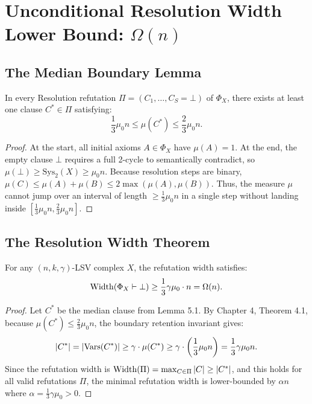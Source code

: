 \chapter{Unconditional Resolution Width Lower Bound: $\Omega(n)$}

\section{The Median Boundary Lemma}
\begin{lemma}
In every Resolution refutation $\Pi = (C_1, \dots, C_S = \bot)$ of $\Phi_X$, there exists at least one clause $C^* \in \Pi$ satisfying:
\[
\frac{1}{3}\mu_0 n \le \mu(C^*) \le \frac{2}{3}\mu_0 n.
\]
\end{lemma}

\begin{proof}
At the start, all initial axioms $A \in \Phi_X$ have $\mu(A) = 1$.
At the end, the empty clause $\bot$ requires a full 2-cycle to semantically contradict, so $\mu(\bot) \ge \mathrm{Sys}_2(X) \ge \mu_0 n$.
Because resolution steps are binary, $\mu(C) \le \mu(A) + \mu(B) \le 2 \max(\mu(A), \mu(B))$.
Thus, the measure $\mu$ cannot jump over an interval of length $\ge \frac{1}{3}\mu_0 n$ in a single step without landing inside $[\frac{1}{3}\mu_0 n, \frac{2}{3}\mu_0 n]$.
\end{proof}

\section{The Resolution Width Theorem}
\begin{theorem}
For any $(n, k, \gamma)$-LSV complex $X$, the refutation width satisfies:
\[
\mathrm{Width}(\Phi_X \vdash \bot) \ge \frac{1}{3} \gamma \mu_0 \cdot n = \Omega(n).
\]
\end{theorem}

\begin{proof}
Let $C^*$ be the median clause from Lemma 5.1.
By Chapter 4, Theorem 4.1, because $\mu(C^*) \le \frac{2}{3}\mu_0 n$, the boundary retention invariant gives:
\[
|C^*| = |\mathrm{Vars}(C^*)| \ge \gamma \cdot \mu(C^*) \ge \gamma \cdot \left(\frac{1}{3}\mu_0 n\right) = \frac{1}{3}\gamma \mu_0 n.
\]
Since the refutation width is $\mathrm{Width}(\Pi) = \max_{C \in \Pi} |C| \ge |C^*|$, and this holds for all valid refutations $\Pi$, the minimal refutation width is lower-bounded by $\alpha n$ where $\alpha = \frac{1}{3}\gamma \mu_0 > 0$.
\end{proof}

